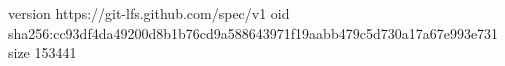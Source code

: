 version https://git-lfs.github.com/spec/v1
oid sha256:cc93df4da49200d8b1b76cd9a588643971f19aabb479c5d730a17a67e993e731
size 153441
